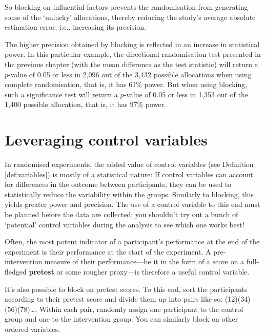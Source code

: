 \documentclass[a4paper]{tufte-book}\usepackage[]{graphicx}\usepackage[]{xcolor}
\newcommand{\term}[1]{\textbf{#1}}
\begin{document}
So blocking on influential factors prevents
the randomisation from generating some of the `unlucky' allocations,
thereby reducing the study's average absolute estimation error, i.e., increasing
its precision.




The higher precision obtained by blocking is reflected
in an increase in statistical power.
In this particular example, the directional randomisation test 
presented in the previous chapter (with the mean difference as the test statistic)
will return a $p$-value of 0.05 or less in 2,096 out of the
3,432 possible allocations when using complete randomisation,
that is, it has 61\% power.
But when using blocking, such a significance test will return
a $p$-value of 0.05 or less in 1,353 out of the 1,400 possible
allocation, that is, it has 97\% power.

\section{Leveraging control variables}\label{sec:covariates}
In randomised experiments, the added value of control variables 
(see Definition \vref{def:variables}) is mostly of a statistical nature:
If control variables can account for differences in the outcome between participants,
they can be used to statistically reduce the variability within the groups.
Similarly to blocking, this yields greater power and precision.
The use of a control variable to this end must be planned before the data
are collected; you shouldn't try out a bunch of `potential' control variables
during the analysis to see which one works best!

Often, the most potent indicator of a participant's performance
at the end of the experiment is their performance at the start of the experiment.
A pre-intervention measure of their performance---be it in the form of a score
on a full-fledged \term{pretest} or some rougher proxy---is 
therefore a useful control variable.

It's also possible to block on pretest scores. 
To this end, sort the participants
according to their pretest score and divide them up into pairs like so:
(12)(34)(56)(78)\dots. Within each pair, randomly assign one participant to the
control group and one to the intervention group.
You can similarly block on other ordered variables.
\end{document}
